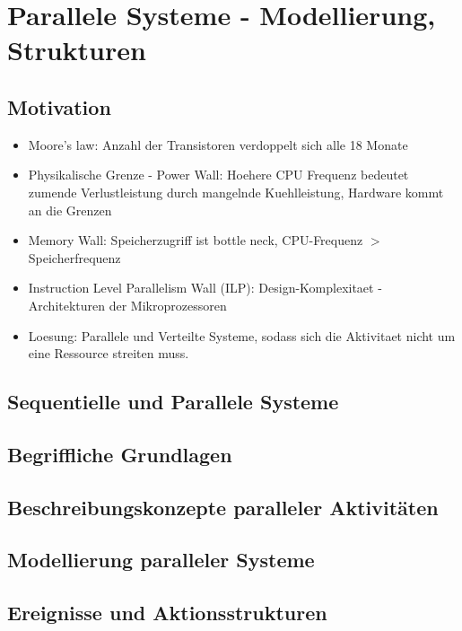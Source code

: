 \chapter{Parallele Systeme - Modellierung, Strukturen}

\section{Motivation}

\begin{itemize}
	\setlength\itemsep{0em}
	\item Moore's law: Anzahl der Transistoren verdoppelt sich alle 18 Monate
	\item Physikalische Grenze - Power Wall: Hoehere CPU Frequenz bedeutet zumende Verlustleistung durch mangelnde Kuehlleistung, Hardware kommt an die Grenzen
	\item Memory Wall: Speicherzugriff ist bottle neck, CPU-Frequenz $>$ Speicherfrequenz
	\item Instruction Level Parallelism Wall (ILP): Design-Komplexitaet - Architekturen der Mikroprozessoren
	\item Loesung: Parallele und Verteilte Systeme, sodass sich die Aktivitaet nicht um eine Ressource streiten muss. 
\end{itemize}

\section{Sequentielle und Parallele Systeme}

\section{Begriffliche Grundlagen}

\section{Beschreibungskonzepte paralleler Aktivitäten}

\section{Modellierung paralleler Systeme}

\section{Ereignisse und Aktionsstrukturen}

